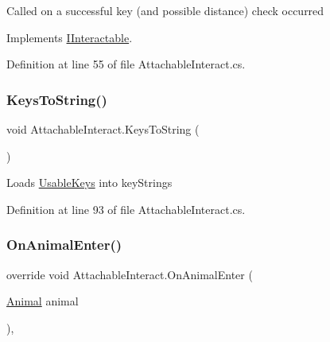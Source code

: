 Called on a successful key (and possible distance) check occurred



Implements \mbox{\hyperlink{interface_i_interactable_ae38fb77e97bc1066db045b32db647681}{I\+Interactable}}.



Definition at line 55 of file Attachable\+Interact.\+cs.

\mbox{\label{class_attachable_interact_a346d5fc16847e2c6c0349b3387ceab45}} 
\subsubsection{\texorpdfstring{Keys\+To\+String()}{KeysToString()}}
{\footnotesize\ttfamily void Attachable\+Interact.\+Keys\+To\+String (\begin{DoxyParamCaption}{ }\end{DoxyParamCaption})\hspace{0.3cm}{\ttfamily [protected]}}



Loads \mbox{\hyperlink{class_attachable_interact_a3c3ffc1d5b3cfd3bc9b4fde20a772901}{Usable\+Keys}} into key\+Strings 



Definition at line 93 of file Attachable\+Interact.\+cs.

\mbox{\label{class_attachable_interact_a376127af23be5456604ee5ec39f02b9b}} 
\subsubsection{\texorpdfstring{On\+Animal\+Enter()}{OnAnimalEnter()}}
{\footnotesize\ttfamily override void Attachable\+Interact.\+On\+Animal\+Enter (\begin{DoxyParamCaption}\item[{\mbox{\hyperlink{class_animal}{Animal}}}]{animal }\end{DoxyParamCaption})\hspace{0.3cm}{\ttfamily [protected]}, {\ttfamily [virtual]}}



